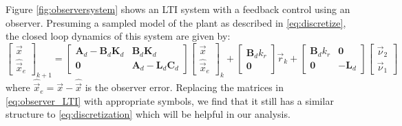 \documentclass[runningheads,a4paper]{llncs}
\newcommand{\mat}[1]{\boldsymbol{#1}}
\begin{document}
Figure \ref{fig:observersystem} shows an LTI system with a feedback control using an observer. Presuming a sampled model of the plant as described in \eqref{eq:discretize}, the closed loop dynamics of this system are given by:
\begin{equation}
\left [\begin{array}{c}\vec{x}\\ \hat{\vec{x}}_e \end{array}\right]_{k+1}
=\left [\begin{array}{cc}\mat{A}_d-\mat{B}_d\mat{K}_d&\mat{B}_d\mat{K}_d\\ \mat{0}&\mat{A}_d-\mat{L}_d\mat{C}_d\end{array}\right]
\left [\begin{array}{c}\vec{x}\\ \hat{\vec{x}}_e \end{array}\right]_k
+\left [\begin{array}{c}\mat{B}_dk_r\\ \mat{0} \end{array}\right] \vec{r}_k
+\left [\begin{array}{cc}\mat{B}_dk_r&\mat{0}\\ \mat{0}&-\mat{L}_d\end{array}\right]\left [\begin{array}{c}\vec{\nu}_2\\ \vec{\nu}_1\end{array}\right]
\label{eq:observer_LTI}
\end{equation}
where $\hat{\vec{x}}_e=\vec{x}-\hat{\vec{x}}$ is the observer error.
Replacing the matrices in \eqref{eq:observer_LTI} with appropriate symbols, we find that it still has a similar structure to \eqref{eq:discretization} which will be helpful in our analysis.
\end{document}
